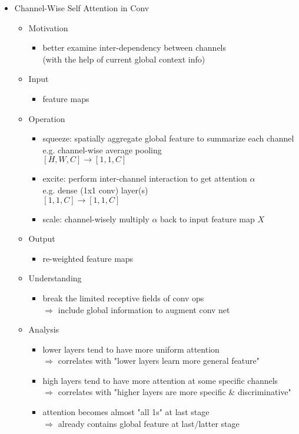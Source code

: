 \begin{itemize}
\item Channel-Wise Self Attention in Conv
	\begin{itemize}
	\item Motivation
		\begin{itemize}
		\item better examine inter-dependency between channels \\
		(with the help of current global context info)
		\end{itemize}
	\item Input
		\begin{itemize}
		\item feature maps
		\end{itemize}
	\item Operation
		\begin{itemize}
		\item squeeze: spatially aggregate global feature to summarize each channel \\
		e.g. channel-wise average pooling \\
		$[H, W, C]\rightarrow [1, 1, C]$
		\item excite: perform inter-channel interaction to get attention $\alpha$ \\
		e.g. dense (1x1 conv) layer(s) \\
		$[1,1,C]\rightarrow [1,1,C]$
		\item scale: channel-wisely multiply $\alpha$ back to input feature map $X$
		\end{itemize}
	\item Output
		\begin{itemize}
		\item re-weighted feature maps
		\end{itemize}
	\item Understanding
		\begin{itemize}
		\item break the limited receptive fields of conv ops \\
		$\Rightarrow$ include global information to augment conv net
		\end{itemize}
	\item Analysis
		\begin{itemize}
		\item lower layers tend to have more uniform attention \\
		$\Rightarrow$ correlates with "lower layers learn more general feature"
		\item high layers tend to have more attention at some specific channels \\
		$\Rightarrow$ correlates with "higher layers are more specific \& discriminative"
		\item attention becomes almost "all 1s" at last stage \\
		$\Rightarrow$ already contains global feature at last/latter stage
		\end{itemize}
	\end{itemize}


\end{itemize}
